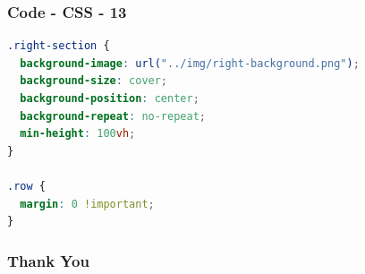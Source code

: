 \documentclass[aspectratio=169, table]{beamer}
\begin{document}
\begin{frame}[fragile]
    \frametitle{Code - CSS - 13}
    \vskip1cm
    \begin{lstlisting}[language=CSS]
.right-section {
  background-image: url("../img/right-background.png");
  background-size: cover;
  background-position: center;
  background-repeat: no-repeat;
  min-height: 100vh;
}

.row {
  margin: 0 !important;
}
    \end{lstlisting}
\end{frame}


\begin{frame4}
    \frametitle{Thank You}
\end{frame4}
\end{document}
